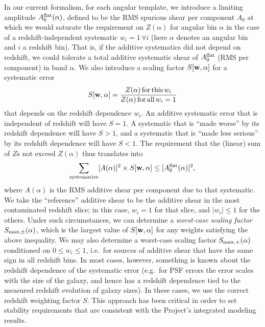 In our current formalism, for each angular template, we introduce a limiting amplitude $A_0^{\rm flat}(\alpha)$, defined to be the RMS spurious shear per component $A_0$ at which we would saturate the requirement on $Z(\alpha)$ for angular bin $\alpha$ in the case of a redshift-independent systematic $w_i=1\,\forall i$ (here $\alpha$ denotes an angular bin and $i$ a redshift bin). That is, if the additive systematics did not depend on redshift, we could tolerate a total additive systematic shear of $A_0^{\rm flat}$ (RMS per component) in band $\alpha$. We also introduce a scaling factor $S[{\bf w},\alpha]$ for a systematic error
\begin{equation}
S[{\bf w},\alpha] = \frac{Z(\alpha) \,{\rm for\,this\,}w_i}{Z(\alpha)\,{\rm for\,all\,}w_i=1}
\end{equation}
that depends on the redshift dependence $w_i$. An additive systematic error that is independent of redshift will have $S=1$. A systematic that is ``made worse'' by its redshift dependence will have $S>1$, and a systematic that is ``made less serious'' by its redshift dependence will have $S<1$. The requirement that the (linear) sum of $Z$s not exceed $Z(\alpha)$ thus translates into
\begin{equation}
\sum_{\rm systematics} [A(\alpha)]^2\times S[{\bf w},\alpha] \le [A_0^{\rm flat}(\alpha)]^2,
\label{eq:A-S-sum}
\end{equation}
where $A(\alpha)$ is the RMS additive shear per component due to that systematic. We take the ``reference'' additive shear to be the additive shear in the most contaminated redshift slice; in this case, $w_i=1$ for that slice, and $|w_i|\le 1$ for the others. Under such
circumstances, we can determine a {\em worst-case scaling factor} $S_{\rm max,\pm}(\alpha)$, which is the largest value of $S[{\bf
w},\alpha]$ for any weights satisfying the above inequality. We may also determine a worst-case scaling factor $S_{\rm max,+}(\alpha)$
conditioned on $0\le w_i\le 1$, i.e.\ for sources of additive shear that have the same sign in all redshift bins. In most cases, however, something is known about the redshift dependence of the systematic error (e.g.\ for PSF errors the error scales with the size of the galaxy, and hence has a redshift dependence tied to the measured redshift evolution of galaxy sizes). In these cases, we use the correct redshift weighting factor $S$. This approach has been critical in order to set stability requirements that are consistent with the Project's integrated modeling results.

